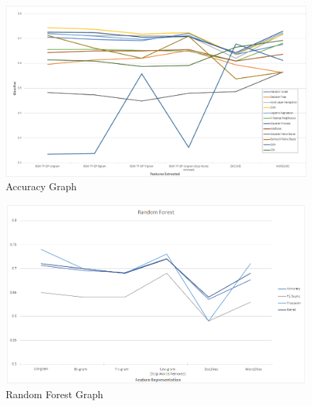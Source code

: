 \begin{figure}[h!]
\centering
\includegraphics[width=1\textwidth]{evaluation/accuracy_graph.png}
\caption{\label{fig:accuracy} Accuracy Graph}
\end{figure}

\begin{figure}[h!]
\centering
\includegraphics[width=1\textwidth]{evaluation/random_forest_graph.png}
\caption{\label{graph:randomforest} Random Forest Graph}
\end{figure}

